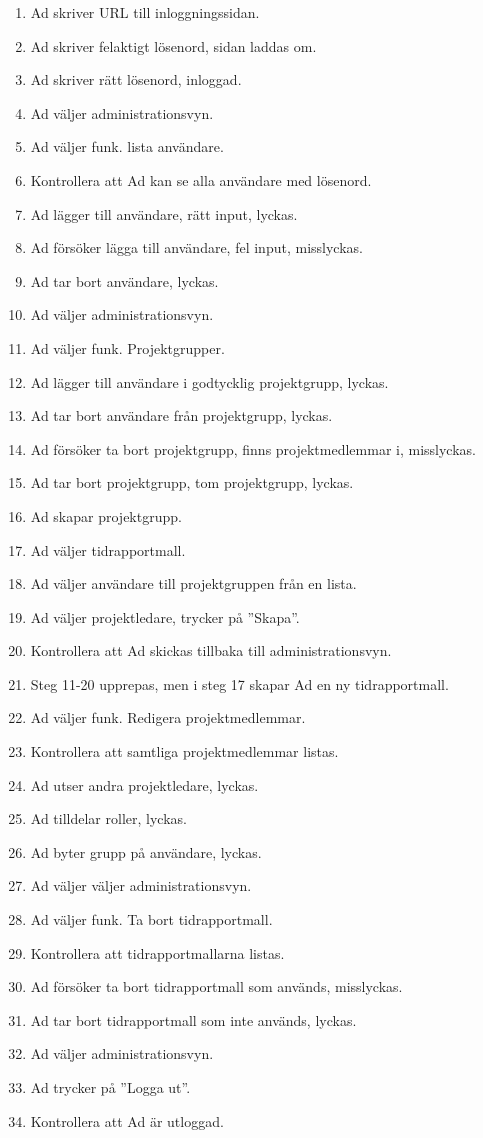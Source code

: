 \documentclass[a4paper]{article}
\begin{document}
\begin{ST}
\begin{enumerate}
\item Ad skriver URL till inloggningssidan.
\item Ad skriver felaktigt lösenord, sidan laddas om.
\item Ad skriver rätt lösenord, inloggad.
\item Ad väljer administrationsvyn.
\item Ad väljer funk. lista användare.
\item Kontrollera att Ad kan se alla användare med lösenord.
\item Ad lägger till användare, rätt input, lyckas.
\item Ad försöker lägga till användare, fel input, misslyckas.
\item Ad tar bort användare, lyckas.
\item Ad väljer administrationsvyn.
\item Ad väljer funk. Projektgrupper.
\item Ad lägger till användare i godtycklig projektgrupp, lyckas.
\item Ad tar bort användare från projektgrupp, lyckas.
\item Ad försöker ta bort projektgrupp, finns projektmedlemmar i, misslyckas.
\item Ad tar bort projektgrupp, tom projektgrupp, lyckas.
\item Ad skapar projektgrupp.
\item Ad väljer tidrapportmall.
\item Ad väljer användare till projektgruppen från en lista.
\item Ad väljer projektledare, trycker på ''Skapa''.
\item Kontrollera att Ad skickas tillbaka till administrationsvyn.
\item Steg 11-20 upprepas, men i steg 17 skapar Ad en ny tidrapportmall.
\item Ad väljer funk. Redigera projektmedlemmar.
\item Kontrollera att samtliga projektmedlemmar listas.
\item Ad utser andra projektledare, lyckas.
\item Ad tilldelar roller, lyckas.
\item Ad byter grupp på användare, lyckas.
\item Ad väljer väljer administrationsvyn.
\item Ad väljer funk. Ta bort tidrapportmall.
\item Kontrollera att tidrapportmallarna listas.
\item Ad försöker ta bort tidrapportmall som används, misslyckas.
\item Ad tar bort tidrapportmall som inte används, lyckas.
\item Ad väljer administrationsvyn.
\item Ad trycker på ''Logga ut''.
\item Kontrollera att Ad är utloggad.
\end{enumerate}

\end{ST}
\end{document}
